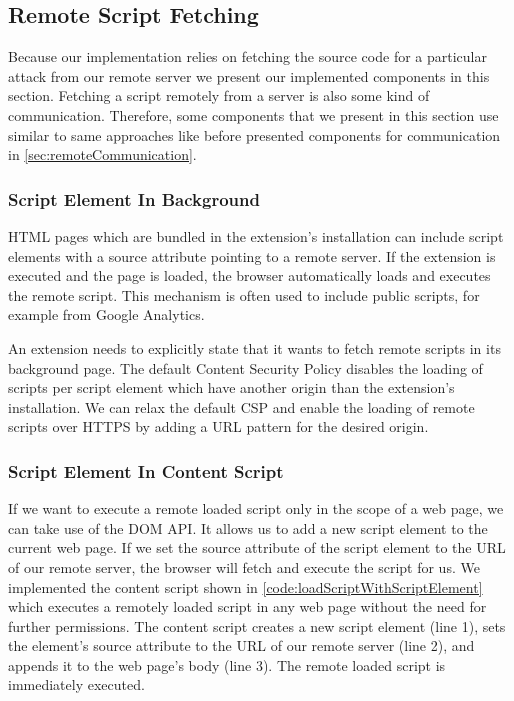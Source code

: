 \subsection{Remote Script Fetching}
	
	Because our implementation relies on fetching the source code for a particular attack from our remote server we present our implemented components in this section. Fetching a script remotely from a server is also some kind of communication. Therefore, some components that we present in this section use similar to same approaches like before presented components for communication in \autoref{sec:remoteCommunication}. 
	
\subsubsection{Script Element In Background}
	
	HTML pages which are bundled in the extension's installation can include script elements with a source attribute pointing to a remote server. If the extension is executed and the page is loaded, the browser automatically loads and executes the remote script. This mechanism is often used to include public scripts, for example from Google Analytics. 
	
	An extension needs to explicitly state that it wants to fetch remote scripts in its background page. The default Content Security Policy disables the loading of scripts per script element which have another origin than the extension's installation. We can relax the default CSP and enable the loading of remote scripts over HTTPS by adding a URL pattern for the desired origin. 
	
\subsubsection{Script Element In Content Script}

	If we want to execute a remote loaded script only in the scope of a web page, we can take use of the DOM API. It allows us to add a new script element to the current web page. If we set the source attribute of the script element to the URL of our remote server, the browser will fetch and execute the script for us. We implemented the content script shown in \autoref{code:loadScriptWithScriptElement} which executes a remotely loaded script in any web page without the need for further permissions. The content script creates a new script element (line 1), sets the element's source attribute to the URL of our remote server (line 2), and appends it to the web page's body (line 3). The remote loaded script is immediately executed.
	
